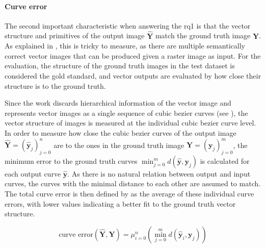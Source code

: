 \paragraph{Curve error}
The second important characteristic when answering the \gls{rq1} is that the vector structure and primitives of the output image $\hat{\mathbf{Y}}$ match the ground truth image $\mathbf{Y}$. As explained in , this is tricky to measure, as there are multiple semantically correct vector images that can be produced given a raster image as input. For the evaluation, the structure of the ground truth images in the test dataset is considered the gold standard, and vector outputs are evaluated by how close their structure is to the ground truth.

Since the work discards hierarchical information of the vector image and represents vector images as a single sequence of cubic bezier curves (see ), the vector structure of images is measured at the individual cubic bezier curve level. In order to measure how close the cubic bezier curves of the output image $\hat{\mathbf{Y}}=(\hat{\mathbf{y}}_j)_{j=0}^n$ are to the ones in the ground truth image $\mathbf{Y}=(\mathbf{y}_j)_{j=0}^m$, the minimum error to the ground truth curves $\min_{j=0}^{m}d(\hat{\mathbf{y}},\mathbf{y}_j)$ is calculated for each output curve $\hat{\mathbf{y}}$. As there is no natural relation between output and input curves, the curves with the minimal distance to each other are assumed to match. The total curve error is then defined by  as the average of these individual curve errors, with lower values indicating a better fit to the ground truth vector structure.

\begin{equation}
\label{eq:curver.error}
    \text{curve error}(\hat{\mathbf{Y}},\mathbf{Y})=\mu_{i=0}^{n}\left(\min_{j=0}^{m}d(\hat{\mathbf{y}}_i,\mathbf{y}_j)\right)
\end{equation}

